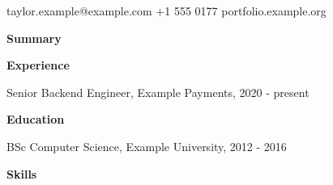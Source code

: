\documentclass[10pt]{article}
\begin{document}
{\LARGE \Person}\par taylor.example@example.com \quad +1 555 0177 \quad portfolio.example.org\par\bigskip
\textbf{Summary}\par \Summary\par\medskip
\textbf{Experience}\par Senior Backend Engineer, Example Payments, 2020 - present\par
\textbullet\par \JobA\par \textbullet\par \JobB\par \textbullet\par \JobC\par\medskip
\textbf{Education}\par BSc Computer Science, Example University, 2012 - 2016\par\medskip
\textbf{Skills}\par \SkillsLine\par
\end{document}
